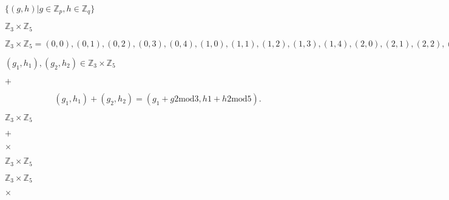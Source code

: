 \documentclass[10pt]{book}
\begin{document}
\begin{mdSnippets}
\begin{mdInlineSnippet}[fb71a560923926b09ceeb9594fe441ed]
$\{(g,h) | g\in\mathbb{Z}_p, h\in\mathbb{Z}_q\}$\end{mdInlineSnippet}%
\begin{mdInlineSnippet}[ae3279d076eb27b24ba0cb905ee71da3]%
$\mathbb{Z}_3\times\mathbb{Z}_5$\end{mdInlineSnippet}%
\begin{mdInlineSnippet}[fb0a8393c011a58c2d5176b0febbd78a]%
$\mathbb{Z}_3\times\mathbb{Z}_5 = (0,0), (0,1), (0,2), (0,3), (0,4), (1,0), (1,1), (1,2), (1,3), (1,4), (2,0), (2,1), (2,2), (2,3), (2,4)$\end{mdInlineSnippet}%
\begin{mdInlineSnippet}[dc369b235d24370a49e8748fae00300a]%
$(g_1, h_1), (g_2, h_2)\in\mathbb{Z}_3\times\mathbb{Z}_5$\end{mdInlineSnippet}%
\begin{mdInlineSnippet}[26b17225b626fb9238849fd60eabdf60]%
$+$\end{mdInlineSnippet}%
\begin{mdDisplaySnippet}[96dd964424c9aaa3f1329a5b8c05fa0a]%
\[%
(g_1,h_1)+(g_2,h_2) = (g_1+g2 \mathrm{mod} 3, h1+h2 \mathrm{mod} 5).
\]%
\end{mdDisplaySnippet}%
\begin{mdInlineSnippet}[ae3279d076eb27b24ba0cb905ee71da3]%
$\mathbb{Z}_3\times\mathbb{Z}_5$\end{mdInlineSnippet}%
\begin{mdInlineSnippet}[26b17225b626fb9238849fd60eabdf60]%
$+$\end{mdInlineSnippet}%
\begin{mdInlineSnippet}[60c13e05d3ec8c10b8564eae7023d9db]%
$\times$\end{mdInlineSnippet}%
\begin{mdInlineSnippet}[ae3279d076eb27b24ba0cb905ee71da3]%
$\mathbb{Z}_3\times\mathbb{Z}_5$\end{mdInlineSnippet}%
\begin{mdInlineSnippet}[ae3279d076eb27b24ba0cb905ee71da3]%
$\mathbb{Z}_3\times\mathbb{Z}_5$\end{mdInlineSnippet}%
\begin{mdInlineSnippet}[60c13e05d3ec8c10b8564eae7023d9db]%
$\times$\end{mdInlineSnippet}%

\end{mdSnippets}
\end{document}
